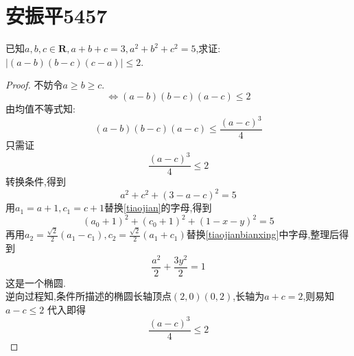 \documentclass[]{article}
\title{}
\author{}
\date{}
\begin{document}
\maketitle
\section{安振平5457}{
已知$a,b,c \in \mathbf{R},a+b+c=3,a^2+b^2+c^2=5$,求证:$|(a-b)(b-c)(c-a)|\leq 2$.

\begin{proof}
不妨令$a\geq b\geq c$.\\
\begin{equation}\nonumber
    \Longleftrightarrow (a-b)(b-c)(a-c)\leq 2
\end{equation}
由均值不等式知:
\begin{equation}\nonumber
    (a-b)(b-c)(a-c)\leq \frac{(a-c)^3}{4}
\end{equation}
只需证
\begin{equation}\label{daizheng}
    \frac{(a-c)^3}{4}\leq 2
\end{equation}
转换条件,得到
\begin{equation}\label{tiaojian}
    a^2+c^2+(3-a-c)^2=5
\end{equation}
用$a_1=a+1,c_1=c+1$替换\eqref{tiaojian}的字母,得到
\begin{equation}\label{tiaojianbianxing}
    (a_0+1)^2+(c_0+1)^2+(1-x-y)^2=5
\end{equation}
再用$\displaystyle a_2=\frac{\sqrt{2}}{2}(a_1-c_1),c_2=\frac{\sqrt{2}}{2}(a_1+c_1)$替换\eqref{tiaojianbianxing}中字母,整理后得到
\begin{equation}
    \frac{a^2}{2}+\frac{3y^2}{2}=1
\end{equation}
这是一个椭圆.\\
逆向过程知,条件所描述的椭圆长轴顶点$(2,0)(0,2)$,长轴为$a+c=2$,则易知$a-c\leq 2$
代入即得
\begin{equation}\nonumber
    \frac{(a-c)^3}{4}\leq 2
\end{equation}
\end{proof}
}
\end{document}
